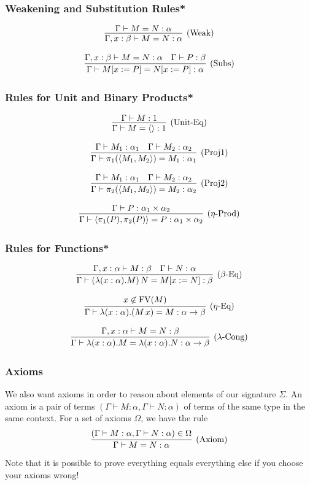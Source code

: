 \documentclass[aspectratio=169]{beamer}
\begin{document}
\begin{frame}
\frametitle{Weakening and Substitution Rules*}

\[
\infer[\text{(Weak)}]{\Gamma, x : \beta \vdash M = N : \alpha}{\Gamma \vdash M = N : \alpha}
\]

\[
\infer[\text{(Subs)}]{\Gamma \vdash M[x := P] = N[x := P] : \alpha}{\Gamma, x : \beta \vdash M = N : \alpha & \Gamma \vdash P : \beta}
\]
\end{frame}

\begin{frame}
\frametitle{Rules for Unit and Binary Products*}

\[
\infer[\text{(Unit-Eq)}]{\Gamma \vdash M = \langle\rangle : 1}{\Gamma \vdash M : 1}
\]

\[
\infer[\text{(Proj1)}]{\Gamma \vdash \pi_1(\langle M_1, M_2 \rangle) = M_1 : \alpha_1}{\Gamma \vdash M_1 : \alpha_1 & \Gamma \vdash M_2 : \alpha_2}
\]

\[
\infer[\text{(Proj2)}]{\Gamma \vdash \pi_2(\langle M_1, M_2 \rangle) = M_2 : \alpha_2}{\Gamma \vdash M_1 : \alpha_1 & \Gamma \vdash M_2 : \alpha_2}
\]

\[
\infer[\text{($\eta$-Prod)}]{\Gamma \vdash \langle \pi_1(P), \pi_2(P) \rangle = P : \alpha_1 \times \alpha_2}{\Gamma \vdash P : \alpha_1 \times \alpha_2}
\]
\end{frame}

\begin{frame}
\frametitle{Rules for Functions*}

\[
\infer[\text{($\beta$-Eq)}]{\Gamma \vdash (\lambda (x : \alpha). M) \, N = M[x := N] : \beta}{\Gamma, x : \alpha \vdash M : \beta & \Gamma \vdash N : \alpha}
\]

\[
\infer[\text{($\eta$-Eq)}]{\Gamma \vdash \lambda (x : \alpha). (M \, x) = M : \alpha \rightarrow \beta}{x \not\in \text{FV}(M)}
\]

\[
\infer[\text{($\lambda$-Cong)}]{\Gamma \vdash \lambda (x : \alpha). M = \lambda (x : \alpha). N : \alpha \rightarrow \beta}{\Gamma, x : \alpha \vdash M = N : \beta}
\]

\end{frame}

\begin{frame}
\frametitle{Axioms}
We also want axioms in order to reason about elements of our signature $\Sigma$.
An axiom is a pair of terms $\left(\Gamma \vdash M : \alpha, \Gamma \vdash N : \alpha\right)$ of terms of the same type in the same context.
For a set of axioms $\Omega$, we have the rule
\[
\infer[\text{(Axiom)}]{\Gamma \vdash M = N : \alpha}{\left(\Gamma \vdash M : \alpha, \Gamma \vdash N : \alpha\right) \in \Omega}
\]
Note that it is possible to prove everything equals everything else if you choose your axioms wrong!
\end{frame}
\end{document}
